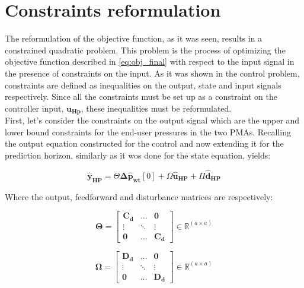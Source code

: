 
\section{Constraints reformulation}
\label{constraints_reformulation}

The reformulation of the objective function, as it was seen, results in a constrained quadratic problem. This problem is the process of optimizing the objective function described in \eqref{eq:obj_final} with respect to the input signal in the presence of constraints on the input. As it was shown in the control problem, constraints are defined as inequalities on the output, state and input signals respectively. Since all the constraints must be set up as a constraint on the controller input, $\bm{u_{Hp}}$, these inequalities must be reformulated. 
\\
\newline
First, let's consider the constraints on the output signal which are the upper and lower bound constraints for the end-user pressures in the two PMAs. Recalling the output equation constructed for the control and now extending it for the prediction horizon, similarly as it wos done for the state equation, yields: 

\begin{equation}
	\bm{\hat{y}_{HP}} = \Theta \bm{\Delta \hat{p}_{wt}}[0] + \Omega \bm{\hat{u}_{HP}} + \Pi \bm{\hat{d}_{HP}}
\end{equation}

Where the output, feedforward and disturbance matrices are respectively: 

\begin{equation}
  \bm{\Theta} =
 \begin{bmatrix}
 \bm{C_d} & \hdots & \bm{0} \\
 \vdots & \ddots & \vdots\\
 \bm{0} & \hdots & \bm{C_d} 
 \end{bmatrix}
 \in \pmb{\mathbb{R}}^{(a \times a)}
\end{equation}

\begin{equation}
   \bm{\Omega}  =
 \begin{bmatrix}
 \bm{D_d} & \hdots & \bm{0} \\
 \vdots & \ddots & \vdots\\
 \bm{0} & \hdots & \bm{D_d} 
 \end{bmatrix}
 \in \pmb{\mathbb{R}}^{(a \times a)}
 \end{equation}
  
